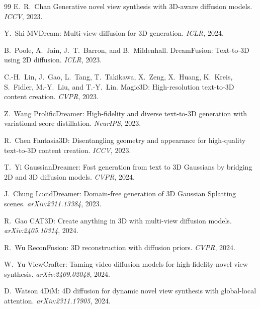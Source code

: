 \begin{thebibliography}{99}
E.~R.~Chan \etal
Generative novel view synthesis with 3D-aware diffusion models.
\emph{ICCV}, 2023.


Y.~Shi \etal
MVDream: Multi-view diffusion for 3D generation.
\emph{ICLR}, 2024.


B.~Poole, A.~Jain, J.~T.~Barron, and B.~Mildenhall.
DreamFusion: Text-to-3D using 2D diffusion.
\emph{ICLR}, 2023.


C.-H.~Lin, J.~Gao, L.~Tang, T.~Takikawa, X.~Zeng, X.~Huang, K.~Kreis,
S.~Fidler, M.-Y.~Liu, and T.-Y.~Lin.
Magic3D: High-resolution text-to-3D content creation.
\emph{CVPR}, 2023.


Z.~Wang \etal
ProlificDreamer: High-fidelity and diverse text-to-3D generation with
variational score distillation.
\emph{NeurIPS}, 2023.


R.~Chen \etal
Fantasia3D: Disentangling geometry and appearance for high-quality text-to-3D
content creation.
\emph{ICCV}, 2023.


T.~Yi \etal
GaussianDreamer: Fast generation from text to 3D Gaussians by bridging 2D
and 3D diffusion models.
\emph{CVPR}, 2024.


J.~Chung \etal
LucidDreamer: Domain-free generation of 3D Gaussian Splatting scenes.
\emph{arXiv:2311.13384}, 2023.


R.~Gao \etal
CAT3D: Create anything in 3D with multi-view diffusion models.
\emph{arXiv:2405.10314}, 2024.


R.~Wu \etal
ReconFusion: 3D reconstruction with diffusion priors.
\emph{CVPR}, 2024.


W.~Yu \etal
ViewCrafter: Taming video diffusion models for high-fidelity novel view synthesis.
\emph{arXiv:2409.02048}, 2024.


D.~Watson \etal
4DiM: 4D diffusion for dynamic novel view synthesis with global-local
attention.
\emph{arXiv:2311.17905}, 2024.



\end{thebibliography}

